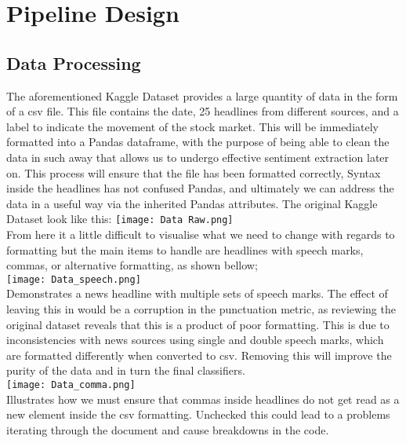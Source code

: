 \documentclass[11pt, a4paper]{article}
\begin{document}
\section{Pipeline Design}
\subsection{Data Processing}
The aforementioned Kaggle Dataset provides a large quantity of data in the form of a csv file. This file contains the date, 25 headlines from different sources, and a label to indicate the movement of the stock market. This will be immediately formatted into a Pandas dataframe, with the purpose of being able to clean the data in such away that allows us to undergo effective sentiment extraction later on. This process will ensure that the file has been formatted correctly, Syntax inside the headlines has not confused Pandas, and ultimately we can address the data in a useful way via the inherited Pandas attributes.
The original Kaggle Dataset look like this:
\texttt{[image: Data Raw.png]} 
\\
From here it a little difficult to visualise what we need to change with regards to formatting but the main items to handle are headlines with speech marks, commas, or alternative formatting, as shown bellow;\\

\texttt{[image: Data\_speech.png]}\\
Demonstrates a news headline with multiple sets of speech marks. The effect of leaving this in would be a corruption in the punctuation metric, as reviewing the original dataset reveals that this is a product of poor formatting. This is due to inconsistencies with news sources using single and double speech marks, which are formatted differently when converted to csv. Removing this will improve the purity of the data and in turn the final classifiers.\\

\texttt{[image: Data\_comma.png]}\\
Illustrates how we must ensure that commas inside headlines do not get read as a new element inside the  csv formatting. Unchecked this could lead to a problems
iterating through the document and cause breakdowns in the code.
 
\end{document}
